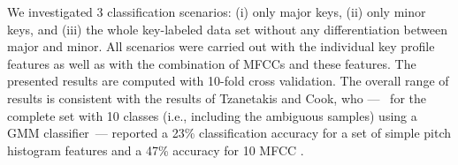 \documentclass{article}
\begin{document}
We investigated 3 classification scenarios: (i) only major keys, (ii) only minor keys, and (iii) the whole key-labeled data set without any differentiation between major and minor. All scenarios were carried out with the individual key profile features as well as with the combination of MFCCs and these features. The presented results are computed with 10-fold cross validation.
The overall range of results is consistent with the results of Tzanetakis and Cook, who ---~ for the complete set with 10 classes (i.e., including the ambiguous samples) using a GMM classifier~--- reported a 23\% classification accuracy for a set of simple pitch histogram features and a 47\% accuracy for 10 MFCC \cite{tzanetakis_musical_2002}. 




\end{document}
